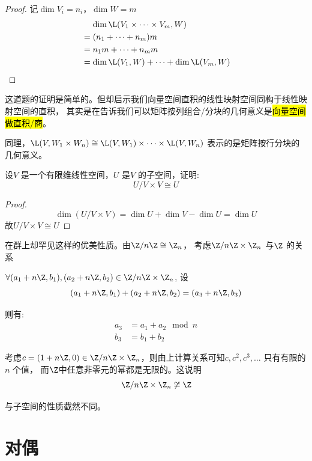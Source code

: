 \begin{proof}
    记\(\dim V_{i}=n_{i}\)，\(\dim W=m\)
    \begin{align*}
        &\mathrel{\phantom{=}}\dim \L(V_{1} \times
        \dots \times V_{m}, W) \\
        &= (n_1+\dots+n_{m})m \\
        &= n_{1}m + \dots + n_{m}m \\
        &= \dim \L(V_{1},W) + \dots +
        \dim \L(V_{m},W)\\
    \end{align*}
\end{proof}
这道题的证明是简单的。但却启示我们向量空间直积的线性映射空间同构于线性映射空间的直积，
其实是在告诉我们可以矩阵按列组合/分块的几何意义是\hl{向量空间做直积/商}。

同理，\(\L(V,W_1\times W_{n})\cong
    \L(V,W_1)\times \dots \times
\L(V,W_{n})\) 表示的是矩阵按行分块的几何意义。

\begin{problem}
    设\(V\) 是一个有限维线性空间，\(U\) 是\(V\) 的子空间，证明:
    \[
        U/V \times V \cong U
    \]
\end{problem}

\begin{proof}
    \[
        \dim (U/V \times V) = \dim U + \dim V - \dim U = \dim U
    \]
    故\(U/V \times V \cong U\)
\end{proof}

在群上却罕见这样的优美性质。由\(\Z/n\Z \cong
\Z_{n}\)，
考虑\(\Z/n\Z\times\Z_{n}\) 与\(\Z\) 的关系

\(\forall (a_1+n\Z, b_1),(a_2+n\Z, b_2) \in
\Z/n\Z \times \Z_{n}\), 设\[
    (a_1+n\Z, b_1)+(a_2+n\Z, b_2) =
    (a_3+n\Z, b_3)
\]

则有:
\begin{align*}
    a_3 &= a_1 + a_2 \mod n \\
    b_3 &= b_1 + b_2
\end{align*}

考虑\(c=(1+n\Z,0) \in \Z/n\Z \times
\Z_{n}\)，则由上计算关系可知\(c, c^{2}, c^{3}, \dots \) 只有有限的\(n\) 个值，
而\(\Z\)中任意非零元的幂都是无限的。这说明
\[
    \Z/n\Z \times \Z_{n} \not\cong \Z
\]

与子空间的性质截然不同。

\section{对偶}

